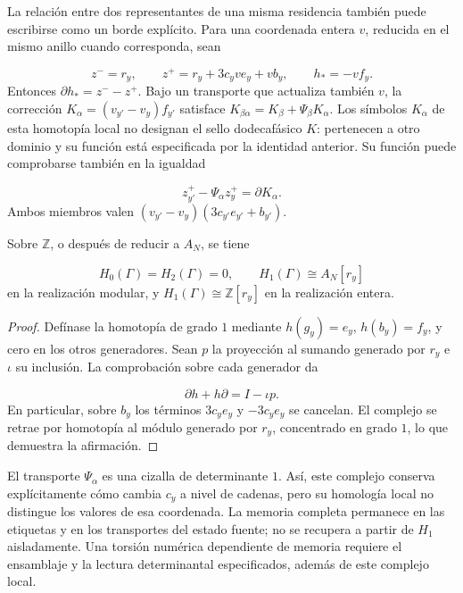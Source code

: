 La relación entre dos representantes de una misma residencia también puede escribirse como un borde explícito. Para una coordenada entera \(v\), reducida en el mismo anillo cuando corresponda, sean

\[
z^-=r_y,\qquad z^+=r_y+3c_yv e_y+v b_y,
\qquad h_*=-vf_y.
\]
Entonces \(\partial h_*=z^--z^+\). Bajo un transporte que actualiza también \(v\), la corrección \(K_\alpha=(v_{y'}-v_y)f_{y'}\) satisface \(K_{\beta\alpha}=K_\beta+\Psi_\beta K_\alpha\). Los símbolos \(K_\alpha\) de esta homotopía local no designan el sello dodecafásico \(K\): pertenecen a otro dominio y su función está especificada por la identidad anterior. Su función puede comprobarse también en la igualdad

\[
z^+_{y'}-\Psi_\alpha z^+_y=\partial K_\alpha.
\]
Ambos miembros valen \((v_{y'}-v_y)(3c_{y'}e_{y'}+b_{y'})\).

\begin{proposition}
\label{iv:cont:memoria-homologia}
Sobre \(\mathbb Z\), o después de reducir a \(A_N\), se tiene

\[
H_0(\Gamma)=H_2(\Gamma)=0,
\qquad H_1(\Gamma)\cong A_N[r_y]
\]
en la realización modular, y \(H_1(\Gamma)\cong\mathbb Z[r_y]\) en la realización entera.

\end{proposition}
\begin{proof}
Defínase la homotopía de grado \(1\) mediante \(h(g_y)=e_y\), \(h(b_y)=f_y\), y cero en los otros generadores. Sean \(p\) la proyección al sumando generado por \(r_y\) e \(\iota\) su inclusión. La comprobación sobre cada generador da

\[
\partial h+h\partial=I-\iota p.
\]
En particular, sobre \(b_y\) los términos \(3c_ye_y\) y \(-3c_ye_y\) se cancelan. El complejo se retrae por homotopía al módulo generado por \(r_y\), concentrado en grado \(1\), lo que demuestra la afirmación.
\end{proof}

El transporte \(\Psi_\alpha\) es una cizalla de determinante \(1\). Así, este complejo conserva explícitamente cómo cambia \(c_y\) a nivel de cadenas, pero su homología local no distingue los valores de esa coordenada. La memoria completa permanece en las etiquetas y en los transportes del estado fuente; no se recupera a partir de \(H_1\) aisladamente. Una torsión numérica dependiente de memoria requiere el ensamblaje y la lectura determinantal especificados, además de este complejo local.

